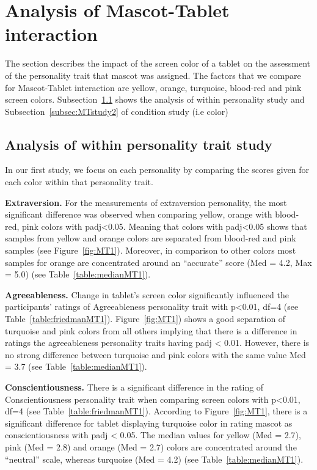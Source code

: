 \section{Analysis of Mascot-Tablet interaction}
\label{sec:m-t}
The section describes the impact of the screen color of a tablet on the assessment of the personality trait that
mascot was assigned.
The factors that we compare for Mascot-Tablet interaction are yellow,
orange, turquoise, blood-red and pink screen colors.
Subsection~\ref{subsec:MTstudy1} shows the analysis of within personality study and Subsection~\ref{subsec:MTstudy2} of condition study (i.e color)

\subsection{Analysis of within personality trait study}
\label{subsec:MTstudy1}
In our first study, we focus on each personality by comparing the scores given
for each color within that personality trait.

\par\textbf{Extraversion.}
For the measurements of extraversion personality,
the most significant difference was observed when comparing yellow, orange with
blood-red, pink colors with padj<0.05.
Meaning that colors with padj<0.05 shows that samples from yellow and orange colors are separated
from blood-red and pink samples (see Figure~\ref{fig:MT1}).
Moreover, in comparison to other colors most samples for orange are concentrated around
an “accurate” score (Med = 4.2, Max = 5.0) (see Table~\ref{table:medianMT1}).

\par\textbf{Agreeableness.}
Change in tablet's screen color significantly influenced the participants' ratings of
Agreeableness personality trait with p<0.01, df=4 (see Table~\ref{table:friedmanMT1}).
Figure~\ref{fig:MT1}) shows a good separation of turquoise and pink colors
from all others implying that there is a difference in ratings the
agreeableness personality traits having padj < 0.01.
However, there is no strong difference between turquoise and pink colors with
the same value Med = 3.7 (see Table~\ref{table:medianMT1}).

\par\textbf{Conscientiousness.}
There is a significant difference in the rating of Conscientiousness personality trait
when comparing screen colors with p<0.01, df=4 (see Table~\ref{table:friedmanMT1}).
According to Figure~\ref{fig:MT1}, there is a significant difference for
tablet displaying turquoise color in rating mascot as conscientiousness with padj < 0.05.
The median values for yellow (Med = 2.7), pink (Med = 2.8) and orange (Med = 2.7) colors are
concentrated around the “neutral” scale, whereas turquoise (Med = 4.2) (see Table~\ref{table:medianMT1}).

